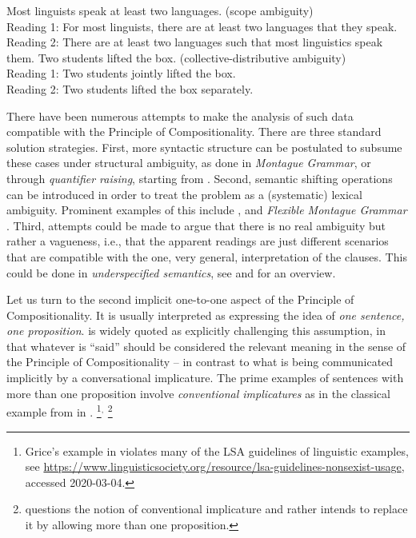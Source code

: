 \documentclass[output=paper]{langscibook}
\begin{document}
\ea
\begin{xlist}
\ex Most linguists speak at least two languages. \hfill (scope ambiguity)\label{ex-scopeamb}\\
Reading 1: For most linguists, there are at least two languages that they speak. %
\\
Reading 2: There are at least two languages such that most linguistics speak them.
\ex Two students lifted the box. \hfill (collective-distributive ambiguity)\label{ex-coldist}\\
Reading 1: Two students jointly lifted the box.\\
Reading 2: Two students lifted the box separately.
\end{xlist}
\z 

\begin{sloppypar}
  There have been numerous attempts to make the analysis of such data
  compatible with the Principle of Compositionality. There are three
  standard solution strategies.  First, more syntactic structure can
  be postulated to subsume these cases under structural ambiguity, as
  done in \emph{Montague Grammar}, \citet{Montague:PTQ} or through
  \emph{quantifier raising}, starting from \citet{May:77}.  Second,
  semantic shifting operations can be introduced in order to treat the
  problem as a (systematic) lexical ambiguity.  Prominent examples of
  this include \citet{Link:83}, \citet{Partee:Rooth:83} and
  \emph{Flexible Montague Grammar} \citep{Hendriks:93}.  Third,
  attempts could be made to argue that there is no real ambiguity but
  rather a vagueness, i.e., that the apparent readings are just
  different scenarios that are compatible with the one, very general,
  interpretation of the clauses. This could be done in
  \emph{underspecified semantics}, see \citet{Pinkal:99} and
  \citet{Egg:11} for an overview.
\end{sloppypar}


Let us turn to the second implicit one-to-one aspect of the Principle
of Compositionality.  It is usually interpreted as expressing the idea
of \emph{one sentence, one proposition}.  \citet{Bach:99} is widely
quoted as explicitly challenging this assumption, in that
whatever is ``said'' should be considered the relevant meaning in the
sense of the Principle of Compositionality -- in contrast to what is
being communicated implicitly by a conversational implicature.  The
prime examples of sentences with more than one proposition involve
\emph{conventional implicatures} as in the classical example from
\citet{Grice:75} in .%
\footnote{Grice's example in  violates many of the LSA
  guidelines of linguistic examples, see
  \url{https://www.linguisticsociety.org/resource/lsa-guidelines-nonsexist-usage},
  accessed 2020-03-04.}$^,$%
\footnote{\citet{Bach:99} questions the notion of conventional
  implicature and rather intends to replace it by allowing more than one
  proposition.  }
 
\end{document}
